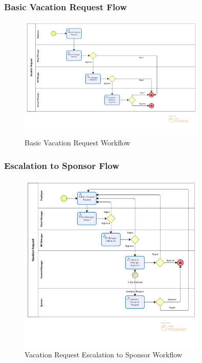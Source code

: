 \documentclass[12pt,a4paper]{article}
\begin{document}
\subsubsection{Basic Vacation Request Flow}
\begin{figure}[H]
\centering
\includegraphics[width=0.8\textwidth]{Diagrams/Workflows/Vacation-Request-Basic-Flow/Vacation-Request-Basic-Flow.png}
\caption{Basic Vacation Request Workflow}
\label{fig:basic-flow}
\end{figure}

\subsubsection{Escalation to Sponsor Flow}
\begin{figure}[H]
\centering
\includegraphics[width=0.8\textwidth]{Diagrams/Workflows/Vacation-Request-Escalation-to-Sponsor/Vacation-Request-Escalation-to-Sponsor.png}
\caption{Vacation Request Escalation to Sponsor Workflow}
\label{fig:escalation-flow}
\end{figure}
\end{document}
